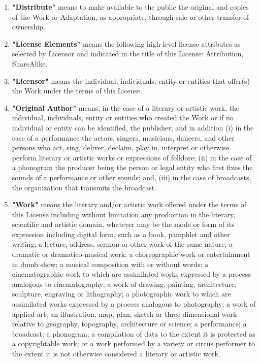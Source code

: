 \begin{enumerate}
          \item\textbf{"Distribute"} means to make available
          to the public the original and copies of the Work or
          Adaptation, as appropriate, through sale or other
          transfer of ownership.

          \item\textbf{"License Elements"} means the
          following high-level license attributes as selected by
          Licensor and indicated in the title of this License:
          Attribution, ShareAlike.

          \item\textbf{"Licensor"} means the individual,
          individuals, entity or entities that offer(s) the Work
          under the terms of this License.

          \item\textbf{"Original Author"} means, in the case
          of a literary or artistic work, the individual,
          individuals, entity or entities who created the Work or
          if no individual or entity can be identified, the
          publisher; and in addition (i) in the case of a
          performance the actors, singers, musicians, dancers, and
          other persons who act, sing, deliver, declaim, play in,
          interpret or otherwise perform literary or artistic works
          or expressions of folklore; (ii) in the case of a
          phonogram the producer being the person or legal entity
          who first fixes the sounds of a performance or other
          sounds; and, (iii) in the case of broadcasts, the
          organization that transmits the broadcast.

          \item\textbf{"Work"} means the literary and/or
          artistic work offered under the terms of this License
          including without limitation any production in the
          literary, scientific and artistic domain, whatever may be
          the mode or form of its expression including digital
          form, such as a book, pamphlet and other writing; a
          lecture, address, sermon or other work of the same
          nature; a dramatic or dramatico-musical work; a
          choreographic work or entertainment in dumb show; a
          musical composition with or without words; a
          cinematographic work to which are assimilated works
          expressed by a process analogous to cinematography; a
          work of drawing, painting, architecture, sculpture,
          engraving or lithography; a photographic work to which
          are assimilated works expressed by a process analogous to
          photography; a work of applied art; an illustration, map,
          plan, sketch or three-dimensional work relative to
          geography, topography, architecture or science; a
          performance; a broadcast; a phonogram; a compilation of
          data to the extent it is protected as a copyrightable
          work; or a work performed by a variety or circus
          performer to the extent it is not otherwise considered a
          literary or artistic work.


\end{enumerate}
